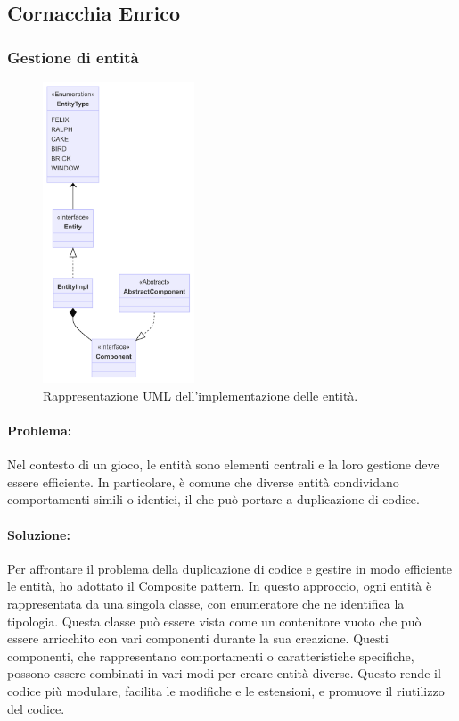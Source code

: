 \documentclass[a4paper,12pt]{report}
\begin{document}
\subsection{Cornacchia Enrico}

\subsubsection{Gestione di entità}

\begin{figure}[H]
\centering{}
\includegraphics[width=0.4\textwidth]{img/entities.png}
\caption{Rappresentazione UML dell'implementazione delle entità.}
\end{figure}

\paragraph{Problema:}
Nel contesto di un gioco, le entità sono elementi centrali e la loro gestione deve essere efficiente. In particolare, è comune che diverse entità condividano comportamenti simili o identici, il che può portare a duplicazione di codice. 

\paragraph{Soluzione:}
Per affrontare il problema della duplicazione di codice e gestire in modo efficiente le entità, ho adottato il Composite pattern. In questo approccio, ogni entità è rappresentata da una singola classe, con enumeratore che ne identifica la tipologia. Questa classe può essere vista come un contenitore vuoto che può essere arricchito con vari componenti durante la sua creazione. Questi componenti, che rappresentano comportamenti o caratteristiche specifiche, possono essere combinati in vari modi per creare entità diverse. Questo rende il codice più modulare, facilita le modifiche e le estensioni, e promuove il riutilizzo del codice. 
\end{document}
